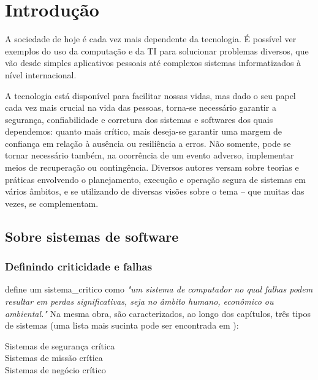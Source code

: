 
\chapter[Introdução]{Introdução}

A sociedade de hoje é cada vez mais dependente da tecnologia. É possível ver 
exemplos do uso da computação e da \gls{TI} para solucionar problemas diversos, 
que vão desde simples aplicativos pessoais até complexos sistemas 
informatizados à nível internacional.

A tecnologia está disponível para facilitar nossas vidas, mas dado o seu papel 
cada vez mais crucial na vida das pessoas, torna-se necessário garantir a 
segurança, confiabilidade e corretura dos sistemas e softwares dos quais 
dependemos: quanto mais crítico, mais deseja-se garantir uma margem de 
confiança em relação à ausência ou resiliência a erros. Não 
somente, pode se tornar necessário também, na ocorrência de um evento adverso, 
implementar meios de recuperação ou contingência. Diversos autores versam sobre 
teorias e práticas envolvendo o planejamento, execução e operação segura de 
sistemas em vários âmbitos, e se utilizando de diversas visões sobre o tema -- 
que muitas das vezes, se complementam.

\section{Sobre sistemas de software}

    \subsection{Definindo criticidade e falhas} 
    \label{introducao_sobre_criticidade}

     define um \gls{sistema_critico} como 
    \emph{"um sistema de computador no qual falhas podem resultar em perdas 
    significativas, seja no âmbito humano, econômico ou ambiental."} Na mesma 
    obra, são caracterizados, ao longo dos capítulos, três tipos de sistemas 
    (uma lista mais sucinta pode ser encontrada em 
    \cite{sommerville_critical_2008}):
    
    \begin{description}
        \item[Sistemas de segurança crítica]
        \item[Sistemas de missão crítica]
        \item[Sistemas de negócio crítico]
    \end{description}
    
